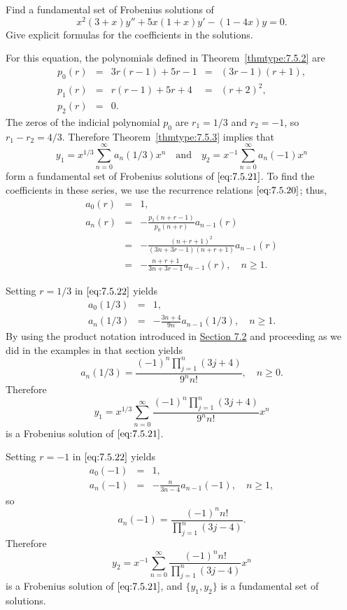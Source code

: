 \documentclass{ximera}
\begin{document}
\begin{example}\label{example:7.5.2}
Find a fundamental set of Frobenius  solutions of
\begin{equation} \label{eq:7.5.21}
x^2(3+x)y''+5x(1+x)y'-(1-4x)y=0.
\end{equation}
Give explicit  formulas for the coefficients in the solutions.

\begin{explanation}
For this equation, the polynomials defined in
Theorem~\ref{thmtype:7.5.2} are
$$
\begin{array}{ccccc}
p_0(r)&=&3r(r-1)+5r-1&=&(3r-1)(r+1),\\
p_1(r)&=&r(r-1)+5r+4&=&(r+2)^2,\\
p_2(r)&=&0.
\end{array}
$$
The zeros of the indicial polynomial $p_0$ are $r_1=1/3$ and $r_2=-1$,
so $r_1-r_2=4/3$. Therefore Theorem~\ref{thmtype:7.5.3} implies that
$$
y_1=x^{1/3}\sum_{n=0}^\infty a_n(1/3)x^n\quad\mbox{and}\quad
y_2=x^{-1}\sum_{n=0}^\infty a_n(-1)x^n
$$
form a fundamental set of Frobenius solutions of $\eqref{eq:7.5.21}$. To
find the coefficients in these series, we use the recurrence relations $\eqref{eq:7.5.20}$;   thus,
\begin{equation} \label{eq:7.5.22}
\begin{array}{ccl}
a_0(r)&=&1,\\
a_n(r)&=&-\frac{p_1(n+r-1)}{p_0(n+r)}a_{n-1}(r)\\
&=&-\frac{(n+r+1)^2}{(3n+3r-1)(n+r+1)}a_{n-1}(r)\\
&=&-\frac{n+r+1}{3n+3r-1}a_{n-1}(r),\quad n\geq1.
\end{array}
\end{equation}

Setting $r=1/3$ in $\eqref{eq:7.5.22}$ yields
\begin{eqnarray*}
a_0(1/3)&=&1,\\
a_n(1/3)&=&-\frac{3n+4}{9n} a_{n-1}(1/3),\quad n\geq1.
\end{eqnarray*}
By using the product notation introduced in \href{https://xerxes.ximera.org/differentialequations/main/seriesSolNearOrdinaryPtI/seriesSolNearOrdinaryPtI}{Section 7.2} and
proceeding as we did in the examples in that section yields
$$
a_n(1/3)=\frac{(-1)^n\prod_{j=1}^n(3j+4)}{9^nn!},\quad n\geq0.
$$
Therefore
$$
y_1=x^{1/3}\sum_{n=0}^\infty\frac{(-1)^n\prod_{j=1}^n(3j+4)}{9^nn!}x^n
$$
is a Frobenius solution of $\eqref{eq:7.5.21}$.

Setting $r=-1$ in $\eqref{eq:7.5.22}$ yields
\begin{eqnarray*}
a_0(-1)&=&1,\\
a_n(-1)&=&-\frac{n}{3n-4}a_{n-1}(-1),\quad n\geq1,
\end{eqnarray*}
so
$$
a_n(-1)=\frac{(-1)^nn!}{\prod_{j=1}^n(3j-4)}.
$$
Therefore
$$
y_2=x^{-1}\sum_{n=0}^\infty\frac{(-1)^nn!}{\prod_{j=1}^n(3j-4)}x^n
$$
is a Frobenius solution of $\eqref{eq:7.5.21}$, and $\{y_1,y_2\}$ is a
fundamental set of solutions.
\end{explanation}
\end{example}
\end{document}
